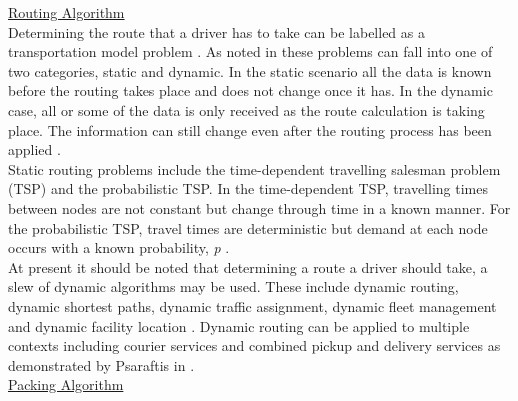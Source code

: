 \documentclass[paper=a4, fontsize=11pt]{scrartcl} %
\numberwithin{equation}{section} %
\numberwithin{figure}{section} %
\numberwithin{table}{section} %
\begin{document}
\underline{Routing Algorithm} \\
Determining the route that a driver has to take can be labelled as a transportation model problem \cite{Psraftis}. As noted in \cite{Ichoua} these problems can fall into one of two categories, static and dynamic. In the static scenario all the data is known before the routing takes place and does not change once it has. In the dynamic case, all or some of the data is only received as the route calculation is taking place. The information can still change even after the routing process has been applied \cite{Madsen} .\\ 

Static routing problems include the time-dependent travelling salesman problem (TSP) and the probabilistic TSP. In  the time-dependent TSP, travelling times between nodes are not constant but change through time in a known manner. For the probabilistic TSP, travel times are deterministic but demand at each node occurs with a known probability, \textit{p} \cite{Psraftis}.\\

At present it should be noted that determining a route a driver should take, a slew of dynamic algorithms may be used. These include dynamic routing, dynamic shortest paths, dynamic traffic assignment, dynamic fleet management and dynamic facility location \cite{Psraftis}. Dynamic routing can be applied to multiple contexts including courier services and combined pickup and delivery services as demonstrated by Psaraftis in \cite{Psraftis}. \\


\underline{Packing Algorithm} \\
\end{document}
